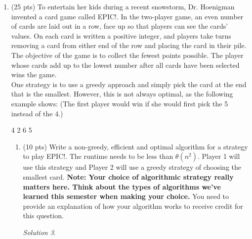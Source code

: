 \documentclass[12pt]{article}
\theoremstyle{remark}
\newtheorem*{solution}{Solution}
\begin{document}
\begin{enumerate}
\begin{enumerate}
\begin{solution}
    \end{solution}
    \pagebreak

    \item (10 pts) Design an algorithm to find the shortest path from Engineering to Humanities that contains exactly $k$ stops (excluding Engineering and Humanities). Notice that a $k$-stop path from these two buildings may not exist. So, your algorithm should also take care of such possibility. You need to provide an explanation of how your algorithm works to receive credit for this question.
    \begin{solution}
    
    \end{solution}
    \pagebreak

    \item (10 pts) Implement your algorithm using the starter code provided on Canvas. 
    
\end{enumerate}

\item (25 pts) To entertain her kids during a recent snowstorm, Dr. Hoenigman invented a card game called EPIC!. In the two-player game, an even number of cards are laid out in a row, face up so that players can see the cards' values. On each card is written a positive integer, and players take turns removing a card from either end of the row and placing the card in their pile. The objective of the game is to collect the fewest points possible. The player whose cards add up to the lowest number after all cards have been selected wins the game.
\\One strategy is to use a greedy approach and simply pick the card at the end that is the smallest. However, this is not always optimal, as the following example shows: (The first player would win if she would first pick the 5 instead of the 4.)

4 2 6 5

\begin{enumerate}
\item (10 pts) Write a non-greedy, efficient and optimal algorithm for a strategy to play EPIC!. The runtime needs to be less than $\theta(n^2)$. Player 1 will use this strategy and Player 2 will use a greedy strategy of choosing the smallest card. \textbf{Note: Your choice of algorithmic strategy really matters here. Think about the types of algorithms we've learned this semester when making your choice.} You need to provide an explanation of how your algorithm works to receive credit for this question.
    \begin{solution}
    

\end{solution}
\end{enumerate}
\end{enumerate}
\end{document}
